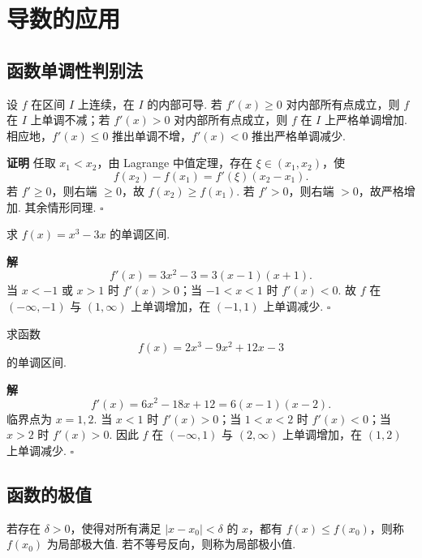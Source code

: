 \documentclass[fontset=fandol]{ctexart}
\newcounter{DefinitionCounter}[section]
\newcounter{TheoremCounter}[section]
\newcounter{PropositionCounter}[section]
\newcounter{ExampleCounter}[section]
\newcounter{ExerciseCounter}[section]
\newenvironment{proofdetail}{\par\noindent\textbf{证明}\quad}{\hfill$\square$\par\vspace{0.8em}}
\newenvironment{solution}{\par\noindent\textbf{解}\quad}{\hfill$\square$\par\vspace{0.8em}}
\newcommand{\renewEnvironmentCounter}{\setcounter{DefinitionCounter}{0}\setcounter{TheoremCounter}{0}\setcounter{PropositionCounter}{0}\setcounter{ExampleCounter}{0}\setcounter{ExerciseCounter}{0}}
\begin{document}
\section{导数的应用}
\renewEnvironmentCounter
\subsection{函数单调性判别法}

\begin{theorem}[单调性判别法]
设 $f$ 在区间 $I$ 上连续，在 $I$ 的内部可导. 若 $f'(x)\geq0$ 对内部所有点成立，则 $f$ 在 $I$ 上单调不减；若 $f'(x)>0$ 对内部所有点成立，则 $f$ 在 $I$ 上严格单调增加. 相应地，$f'(x)\leq0$ 推出单调不增，$f'(x)<0$ 推出严格单调减少.
\end{theorem}
\begin{proofdetail}
任取 $x_1<x_2$，由 Lagrange 中值定理，存在 $\xi\in(x_1,x_2)$，使
\[
f(x_2)-f(x_1)=f'(\xi)(x_2-x_1).
\]
若 $f'\geq0$，则右端 $\geq0$，故 $f(x_2)\geq f(x_1)$. 若 $f'>0$，则右端 $>0$，故严格增加. 其余情形同理.
\end{proofdetail}

\begin{example}[求单调区间]
求 $f(x)=x^3-3x$ 的单调区间.
\end{example}
\begin{solution}
\[
f'(x)=3x^2-3=3(x-1)(x+1).
\]
当 $x<-1$ 或 $x>1$ 时 $f'(x)>0$；当 $-1<x<1$ 时 $f'(x)<0$. 故 $f$ 在 $(-\infty,-1)$ 与 $(1,\infty)$ 上单调增加，在 $(-1,1)$ 上单调减少.
\end{solution}

\begin{example}[求单调区间]
求函数
\[
f(x)=2x^3-9x^2+12x-3
\]
的单调区间.
\end{example}
\begin{solution}
\[
f'(x)=6x^2-18x+12=6(x-1)(x-2).
\]
临界点为 $x=1,2$. 当 $x<1$ 时 $f'(x)>0$；当 $1<x<2$ 时 $f'(x)<0$；当 $x>2$ 时 $f'(x)>0$. 因此 $f$ 在 $(-\infty,1)$ 与 $(2,\infty)$ 上单调增加，在 $(1,2)$ 上单调减少.
\end{solution}

\subsection{函数的极值}

\begin{definition}[局部极值]
若存在 $\delta>0$，使得对所有满足 $|x-x_0|<\delta$ 的 $x$，都有 $f(x)\leq f(x_0)$，则称 $f(x_0)$ 为局部极大值. 若不等号反向，则称为局部极小值.
\end{definition}
\end{document}

